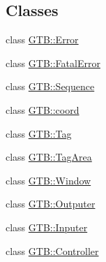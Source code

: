 \subsection*{Classes}
\begin{DoxyCompactItemize}
\item 
class \hyperlink{a00012}{G\+T\+B\+::\+Error}
\item 
class \hyperlink{a00016}{G\+T\+B\+::\+Fatal\+Error}
\item 
class \hyperlink{a00020}{G\+T\+B\+::\+Sequence}
\item 
class \hyperlink{a00024}{G\+T\+B\+::coord}
\item 
class \hyperlink{a00028}{G\+T\+B\+::\+Tag}
\item 
class \hyperlink{a00032}{G\+T\+B\+::\+Tag\+Area}
\item 
class \hyperlink{a00036}{G\+T\+B\+::\+Window}
\item 
class \hyperlink{a00040}{G\+T\+B\+::\+Outputer}
\item 
class \hyperlink{a00044}{G\+T\+B\+::\+Inputer}
\item 
class \hyperlink{a00048}{G\+T\+B\+::\+Controller}
\end{DoxyCompactItemize}
